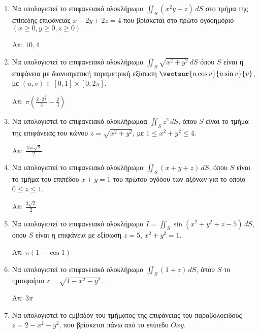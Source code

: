 






\thispagestyle{empty}

\begin{center}
\end{center}

\vspace{\baselineskip}

\begin{enumerate}

\item Να υπολογιστεί το επιφανειακό ολοκλήρωμα $\iint_{S}(x^{2}y+z)\,dS$ στο τμήμα της επίπεδης επιφάνειας $x+2y+2z=4$ που βρίσκεται στο πρώτο ογδοημόριο $(x\geq 0, y\geq 0, z\geq 0)$

\hfill Απ: $10,4$

\item Να υπολογιστεί το επιφανειακό ολοκλήρωμα $\iint_{S}\sqrt{x^{2}+y^{2}}\,dS$ όπου $S$ είναι η επιφάνεια με διανυσματική παραμετρική εξίσωση $\vectsur{u\cos v}{u\sin v}{v}$, με $(u,v)\in [0,1]\times[0,2\pi]$.

\hfill Απ: $\pi\left(\frac{2\cdot 2^{\frac{3}{2}}}{3}-\frac{2}{3}\right)$

\item Να υπολογιστεί το επιφανειακό ολοκλήρωμαα $\iint_{S}z^{2}\,dS$, όπου $S$ είναι το τμήμα της επιφάνειας του κώνου $z=\sqrt{x^{2}+y^{2}}$, με $1\leq x^{2}+y^{2}\leq 4$.

\hfill Απ: $\frac{15\pi\sqrt{2}}{2}$

\item Να υπολογιστεί το επιφανειακό ολοκλήρωμα $\iint_{S}(x+y+z)\,dS$, όπου $S$ είναι το τμήμα του επιπέδου $x+y=1$ του πρώτου ογδόου των αξόνων για το οποίο $0\leq z\leq 1$.

\hfill Απ: $\frac{3\sqrt{2}}{2}$

\item Να υπολογιστεί το επιφανειακό ολοκλήρωμα $I=\iint_{S}\sin(x^{2}+y^{2}+z-5)\,dS$, όπου $S$ είναι η επιφάνεια με εξίσωση $z=5$, $x^{2}+y^{2}=1$.

\hfill Απ: $\pi(1-\cos 1)$

\item Να υπολογιστεί το επιφανειακό ολοκλήρωμα $\iint_{S}(1+z)\,dS$, όπου $S$  το ημισφαίριο $z=\sqrt{1-x^{2}-y^{2}}$.

\hfill Απ: $3\pi$

\item Να υπολογιστεί το εμβαδόν του τμήματος της επιφάνειας του παραβολοειδούς $z=2-x^{2}-y^{2}$, που βρίσκεται πάνω από το επίπεδο $Oxy$.


\end{enumerate}

